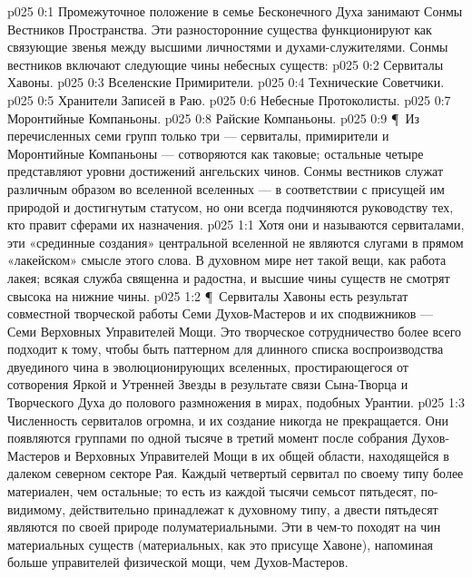 \author{Облеченный Высокой Властью}
\vs p025 0:1 Промежуточное положение в семье Бесконечного Духа занимают Сонмы Вестников Пространства. Эти разносторонние существа функционируют как связующие звенья между высшими личностями и духами\hyp{}служителями. Сонмы вестников включают следующие чины небесных существ:
\vs p025 0:2 \bibnobreakspace Сервиталы Хавоны.
\vs p025 0:3 \bibnobreakspace Вселенские Примирители.
\vs p025 0:4 \bibnobreakspace Технические Советчики.
\vs p025 0:5 \bibnobreakspace Хранители Записей в Раю.
\vs p025 0:6 \bibnobreakspace Небесные Протоколисты.
\vs p025 0:7 \bibnobreakspace Моронтийные Компаньоны.
\vs p025 0:8 \bibnobreakspace Райские Компаньоны.
\vs p025 0:9 \P\ Из перечисленных семи групп только три --- сервиталы, примирители и Моронтийные Компаньоны --- сотворяются как таковые; остальные четыре представляют уровни достижений ангельских чинов. Сонмы вестников служат различным образом во вселенной вселенных --- в соответствии с присущей им природой и достигнутым статусом, но они всегда подчиняются руководству тех, кто правит сферами их назначения.
\vs p025 1:1 Хотя они и называются сервиталами, эти «срединные создания» центральной вселенной не являются слугами в прямом «лакейском» смысле этого слова. В духовном мире нет такой вещи, как работа лакея; всякая служба священна и радостна, и высшие чины существ не смотрят свысока на нижние чины.
\vs p025 1:2 \P\ Сервиталы Хавоны есть результат совместной творческой работы Семи Духов\hyp{}Мастеров и их сподвижников --- Семи Верховных Управителей Мощи. Это творческое сотрудничество более всего подходит к тому, чтобы быть паттерном для длинного списка воспроизводства двуединого чина в эволюционирующих вселенных, простирающегося от сотворения Яркой и Утренней Звезды в результате связи Сына\hyp{}Творца и Творческого Духа до полового размножения в мирах, подобных Урантии.
\vs p025 1:3 Численность сервиталов огромна, и их создание никогда не прекращается. Они появляются группами по одной тысяче в третий момент после собрания Духов\hyp{}Мастеров и Верховных Управителей Мощи в их общей области, находящейся в далеком северном секторе Рая. Каждый четвертый сервитал по своему типу более материален, чем остальные; то есть из каждой тысячи семьсот пятьдесят, по\hyp{}видимому, действительно принадлежат к духовному типу, а двести пятьдесят являются по своей природе полуматериальными. Эти  в чем\hyp{}то походят на чин материальных существ (материальных, как это присуще Хавоне), напоминая больше управителей физической мощи, чем Духов\hyp{}Мастеров.
